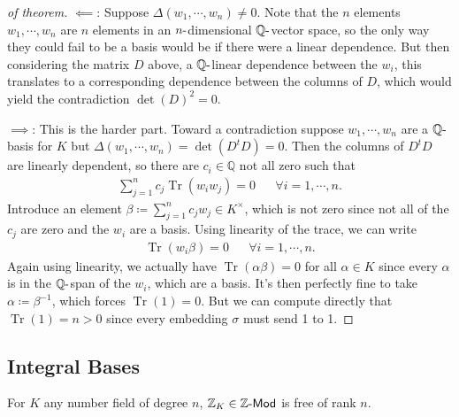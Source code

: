 \begin{proof}[of theorem]

\(\impliedby\): Suppose \(\Delta(w_1, \cdots, w_n) \neq 0\). Note that
the \(n\) elements \(w_1, \cdots, w_n\) are \(n\) elements in an
\(n{\hbox{-}}\)dimensional \({\mathbb{Q}}{\hbox{-}}\)vector space, so
the only way they could fail to be a basis would be if there were a
linear dependence. But then considering the matrix \(D\) above, a
\({\mathbb{Q}}{\hbox{-}}\)linear dependence between the \(w_i\), this
translates to a corresponding dependence between the columns of \(D\),
which would yield the contradiction \(\det(D)^2 = 0\).

\(\implies\): This is the harder part. Toward a contradiction suppose
\(w_1, \cdots, w_n\) are a \({\mathbb{Q}}{\hbox{-}}\)basis for \(K\) but
\(\Delta(w_1, \cdots, w_n) = \det(D^t D) = 0\). Then the columns of
\(D^t D\) are linearly dependent, so there are \(c_i \in {\mathbb{Q}}\)
not all zero such that
\begin{align*}
\sum_{j=1}^n c_j \operatorname{Tr}( w_i w_j) = 0 && \forall i=1, \cdots, n
.\end{align*}
Introduce an element
\(\beta \coloneqq\sum_{j=1}^n c_j w_j \in K^{\times}\), which is not
zero since not all of the \(c_j\) are zero and the \(w_i\) are a basis.
Using linearity of the trace, we can write
\begin{align*}
\operatorname{Tr}(w_i \beta) = 0 && \forall i=1, \cdots, n
.\end{align*}
Again using linearity, we actually have
\(\operatorname{Tr}( \alpha \beta) = 0\) for all \(\alpha\in K\) since
every \(\alpha\) is in the \({\mathbb{Q}}{\hbox{-}}\)span of the
\(w_i\), which are a basis. It's then perfectly fine to take
\(\alpha \coloneqq\beta^{-1}\), which forces
\(\operatorname{Tr}(1) = 0\). But we can compute directly that
\(\operatorname{Tr}(1) = n > 0\) since every embedding \(\sigma\) must
send 1 to 1.

\end{proof}

\hypertarget{integral-bases}{%
\subsection{Integral Bases}\label{integral-bases}}

\begin{theorem}

For \(K\) any number field of degree \(n\),
\({\mathbb{Z}}_K \in {\mathsf{{\mathbb{Z}}}{\hbox{-}}\mathsf{Mod}}\) is
free of rank \(n\).

\end{theorem}

